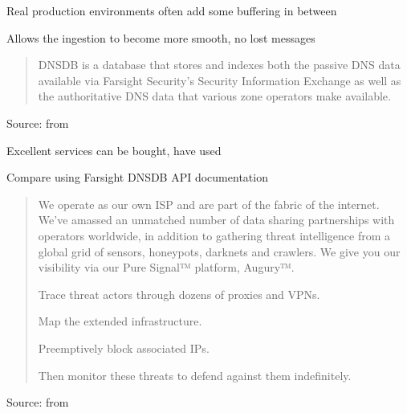\documentclass[Screen16to9,17pt]{foils}
\begin{document}
\begin{list2}
\item Real production environments often add some buffering in between
\item Allows the ingestion to become more smooth, no lost messages
\end{list2}




\begin{quote}
DNSDB is a database that stores and indexes both the passive DNS data available via Farsight Security’s Security Information Exchange as well as the authoritative DNS data that various zone operators make available.
\end{quote}
Source: from 
\begin{list2}
  \item Excellent services can be bought, have used 
\item Compare using 
  Farsight DNSDB API documentation
\item {}

\end{list2}



\begin{quote}
  We operate as our own ISP and are part of the fabric of the internet. We’ve amassed an unmatched number of data sharing partnerships with operators worldwide, in addition to gathering threat intelligence from a global grid of sensors, honeypots, darknets and crawlers. We give you our visibility via our Pure Signal™ platform, Augury™.

\begin{list2}
\item Trace threat actors through dozens of proxies and VPNs.
\item Map the extended infrastructure.
\item Preemptively block associated IPs.
\item Then monitor these threats to defend against them indefinitely.
\end{list2}
\end{quote}
Source: from 
\end{document}
